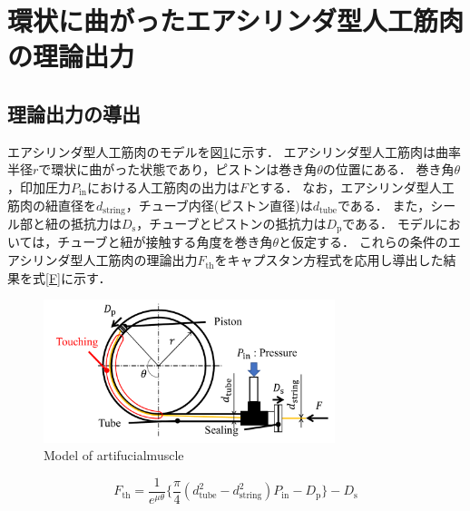 \section{環状に曲がったエアシリンダ型人工筋肉の理論出力}%
\subsection{理論出力の導出}%
エアシリンダ型人工筋肉のモデルを図\ref{Model of artifucialmuscle}に示す．
エアシリンダ型人工筋肉は曲率半径$r$で環状に曲がった状態であり，ピストンは巻き角$\theta$の位置にある．
巻き角$\theta$，印加圧力$P_\mathrm{in}$における人工筋肉の出力は$F$とする．
なお，エアシリンダ型人工筋肉の紐直径を$d_\mathrm{string}$，チューブ内径(ピストン直径)は$d_\mathrm{tube}$である．
また，シール部と紐の抵抗力は$D_\mathrm{s}$，チューブとピストンの抵抗力は$D_\mathrm{p}$である．
モデルにおいては，チューブと紐が接触する角度を巻き角$\theta$と仮定する．
これらの条件のエアシリンダ型人工筋肉の理論出力$F_\mathrm{th}$をキャプスタン方程式を応用し導出した結果を式\eqref{F}に示す．
\begin{figure}[t]
  \centering
  \includegraphics[width=85mm]{_pdf/model_artifucialmuscle.pdf}
  \caption{Model of artifucialmuscle}
  \label{Model of artifucialmuscle}
\end{figure}

\begin{equation}
  \label{F}
  F_\mathrm{th}=\frac{1}{e^{\mu\theta}} \{\frac{π}{4}(d_\mathrm{tube}^2 - d_\mathrm{string}^2)P_\mathrm{in}-D_\mathrm{p} \}-D_\mathrm{s}
\end{equation}

